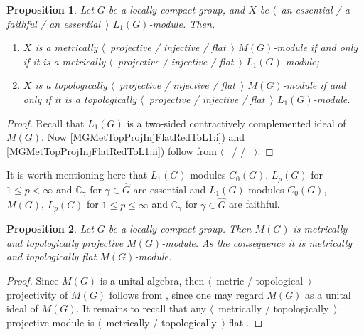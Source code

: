 \documentclass{article}
\theoremstyle{plain}
\newtheorem{proposition}{Proposition}[section]
\theoremstyle{definition}
\newtheorem{proof}{Proof}\def\theproof{}
\begin{document}
\begin{fulltext}
\begin{proposition}\label{MGMetTopProjInjFlatRedToL1} Let $G$ be a locally compact group, 
and $X$ be $\langle$~an essential / a faithful / an essential~$\rangle$ $L_1(G)$-module. 
Then,
\begin{enumerate}
    \item $X$ is a metrically $\langle$~projective / injective / flat~$\rangle$ $M(G)$-module 
    if and only if it is a metrically $\langle$~projective / injective / flat~$\rangle$ 
    $L_1(G)$-module;
    \label{MGMetTopProjInjFlatRedToL1:i}
    \item $X$ is a topologically $\langle$~projective / injective / flat~$\rangle$ 
    $M(G)$-module if and only if it is a topologically $\langle$~projective / injective / 
    flat~$\rangle$ $L_1(G)$-module.
    \label{MGMetTopProjInjFlatRedToL1:ii}
\end{enumerate}
\end{proposition}
\begin{proof} Recall that $L_1(G)$ is a two-sided contractively complemented ideal of 
$M(G)$. Now \ref{MGMetTopProjInjFlatRedToL1:i}) and \ref{MGMetTopProjInjFlatRedToL1:ii}) follow from 
$\langle$~\cite[proposition 2.6]{NemGeomProjInjFlatBanMod} / 
\cite[proposition 2.16]{NemGeomProjInjFlatBanMod} / 
\cite[proposition 2.24]{NemGeomProjInjFlatBanMod}~$\rangle$.
\end{proof} 

It is worth mentioning here that $L_1(G)$-modules $C_0(G)$, $L_p(G)$ for $1\leq p<\infty$ 
and $\mathbb{C}_\gamma$ for $\gamma\in\widehat{G}$ are essential and $L_1(G)$-modules 
$C_0(G)$, $M(G)$, $L_p(G)$ for $1\leq p\leq \infty$ and $\mathbb{C}_\gamma$ for 
$\gamma\in\widehat{G}$ are faithful. 

\begin{proposition}\label{MGModMGMetTopProjFlatCharac} Let $G$ be a locally compact group. 
Then $M(G)$ is metrically and topologically projective $M(G)$-module. As the consequence it 
is metrically and topologically flat $M(G)$-module.
\end{proposition} 
\begin{proof} Since $M(G)$ is a unital algebra, then $\langle$~metric / topological~$\rangle$ 
projectivity of $M(G)$ follows from \cite[proposition 7]{NemMetTopProjIdBanAlg}, since one 
may regard $M(G)$ as a unital ideal of $M(G)$. It 
remains to recall that any $\langle$~metrically / topologically~$\rangle$ projective 
module is $\langle$~metrically / topologically~$\rangle$ flat 
\cite[proposition 2.26]{NemGeomProjInjFlatBanMod}.
\end{proof}


\end{fulltext}
\end{document}
